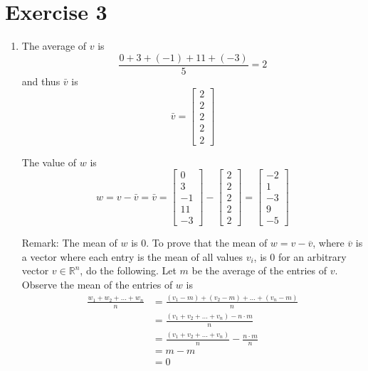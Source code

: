 \documentclass{article}
\begin{document}
\section*{Exercise 3}


\begin{enumerate}[label = (\arabic*)]
	\item The average of $v$ is
	\[
		\frac{0 + 3 + (-1) + 11 + (-3)}{5} = 2
	\]
	and thus $\bar{v}$ is
	\[
		\bar{v} = \begin{bmatrix}
		2 \\ 2 \\ 2 \\ 2 \\ 2
		\end{bmatrix}
	\]
	
	The value of $w$ is
	\[
		w = v - \bar{v} = \bar{v} = \begin{bmatrix}
		0 \\ 3 \\ -1 \\ 11 \\ -3
		\end{bmatrix} - \begin{bmatrix}
		2 \\ 2 \\ 2 \\ 2 \\ 2
		\end{bmatrix} = 
		\begin{bmatrix}
		-2 \\ 1 \\ -3 \\ 9 \\ -5
		\end{bmatrix}
	\]
	
	Remark: The mean of $w$ is $0$. To prove that the mean of $w = v-\overline{v}$, where $\overline{v}$ is a vector where each entry is the mean of all values $v_i$, is $0$ for an arbitrary vector $v\in \mathbb{R}^n$, do the following. Let $m$ be the average of the entries of $v$. Observe the mean of the entries of $w$ is
	\begin{align*}
		\frac{w_1 + w_2 + \dots + w_n}{n} & = \frac{(v_1 - m) + (v_2 - m)  + \dots + (v_n - m)}{n} \\
		& = \frac{(v_1 + v_2 + \dots + v_n) - n\cdot m}{n} \\
		& = \frac{(v_1 + v_2 + \dots + v_n)}{n} - \frac{n\cdot m}{n} \\
		& = m - m \\
		& = 0
	\end{align*}
	

\end{enumerate}
\end{document}
